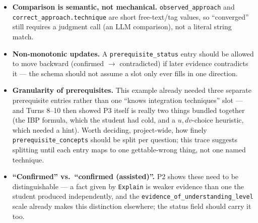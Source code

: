 \documentclass[11pt]{article}
\begin{document}
\begin{itemize}
  \item \textbf{Comparison is semantic, not mechanical.} \texttt{observed\_approach}
  and \texttt{correct\_approach.technique} are short free-text/tag values, so
  ``converged'' still requires a judgment call (an LLM comparison), not a
  literal string match.
  \item \textbf{Non-monotonic updates.} A \texttt{prerequisite\_status} entry
  should be allowed to move backward (confirmed $\to$ contradicted) if later
  evidence contradicts it --- the schema should not assume a slot only ever
  fills in one direction.
  \item \textbf{Granularity of prerequisites.} This example already needed
  three separate prerequisite entries rather than one ``knows integration
  techniques'' slot --- and Turns 8--10 then showed P3 itself is really two
  things bundled together (the IBP formula, which the student had cold, and
  a $u,dv$-choice heuristic, which needed a hint). Worth deciding,
  project-wide, how finely \texttt{prerequisite\_concepts} should be split
  per question; this trace suggests splitting until each entry maps to one
  gettable-wrong thing, not one named technique.
  \item \textbf{``Confirmed'' vs.\ ``confirmed (assisted)''.} P2 shows these
  need to be distinguishable --- a fact given by \texttt{Explain} is weaker
  evidence than one the student produced independently, and the
  \texttt{evidence\_of\_understanding\_level} scale already makes this
  distinction elsewhere; the status field should carry it too.
\end{itemize}
\end{document}

